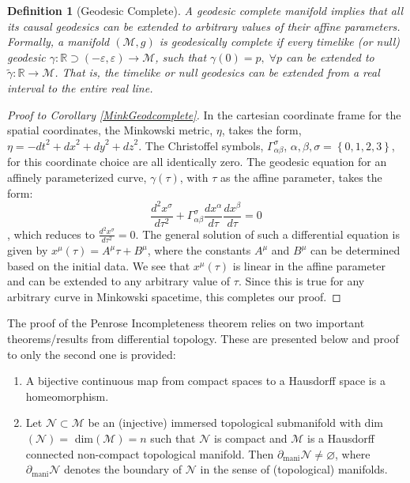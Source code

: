 \documentclass[12pt, a4paper]{report}
\theoremstyle{bfnote}
\newtheorem{definition}{Definition}
\begin{document}
\begin{definition}[Geodesic Complete]
    A geodesic complete manifold implies that all its causal geodesics can be
    extended to arbitrary values of their affine parameters. Formally, a
    manifold $\left(\mathcal{M}, g\right)$ is geodesically complete if every
    timelike (or null) geodesic $\gamma : \mathbb{R}\supset \left(-\varepsilon,
    \varepsilon\right) \to \mathcal{M}$, such that $\gamma\left(0\right) = p,
    \;\forall p$ can be extended to $\widetilde{\gamma} : \mathbb{R} \to
    \mathcal{M}$. That is, the timelike or null geodesics can be extended from a
    real interval to the entire real line. 
\end{definition}

\begin{proof}[Proof to Corollary \ref{MinkGeodcomplete}] 
    In the cartesian coordinate frame for the spatial coordinates, the Minkowski
    metric, $\eta$, takes the form, $\eta = -\textit{dt}^2 + \textit{dx}^2 +
    \textit{dy}^2 + \textit{dz}^2$. The Christoffel symbols,
    $\Gamma^{\sigma}_{\alpha\beta}$, $\alpha, \beta, \sigma = \left\{0, 1, 2,
    3\right\}$, for this coordinate choice are all identically zero. The geodesic
    equation for an affinely parameterized curve, $\gamma\left(\tau\right)$,
    with $\tau$ as the affine parameter, takes the form:
    \begin{equation*}
        \frac{d^2 x^\sigma}{d\tau^2} + \Gamma^{\sigma}_{\alpha\beta}\frac{dx^\alpha}{d\tau}\dfrac{dx^\beta}{d\tau} = 0
    \end{equation*}
    , which reduces to {\large{$\frac{d^2 x^\sigma}{d\tau^2} = 0$}}. The general
    solution of such a differential equation is given by
    $x^{\mu}\left(\tau\right) = A^\mu \tau + B^\mu$, where the constants $A^\mu$
    and $B^\mu$ can be determined based on the initial data. We see that
    $x^\mu\left(\tau\right)$ is linear in the affine parameter and can be
    extended to any arbitrary value of $\tau$. Since this is true for any
    arbitrary curve in Minkowski spacetime, this completes our proof.
\end{proof}

The proof of the Penrose Incompleteness theorem relies on two important
theorems/results from differential topology. These are presented below and proof
to only the second one is provided:
\begin{enumerate}[leftmargin=*, label={\bfseries{Ingredient theorem (\roman*)}}]
	\item \label{topologicaltheorem1} A bijective continuous map from compact
	spaces to a Hausdorff space is a homeomorphism.
	\item \label{topologicaltheorem2} Let $\mathcal{N} \subset \mathcal{M}$ be
	an (injective) immersed topological submanifold with
	dim$\left(\mathcal{N}\right) = $ dim$\left(\mathcal{M}\right) = n$ such that
	$\mathcal{N}$ is compact and $\mathcal{M}$ is a Hausdorff connected
	non-compact topological manifold. Then $\partial_{\text{mani}}\mathcal{N} \neq
	\varnothing$, where $\partial_{\text{mani}}\mathcal{N}$ denotes the boundary
	of $\mathcal{N}$ in the sense of (topological) manifolds.
\end{enumerate}
\end{document}
